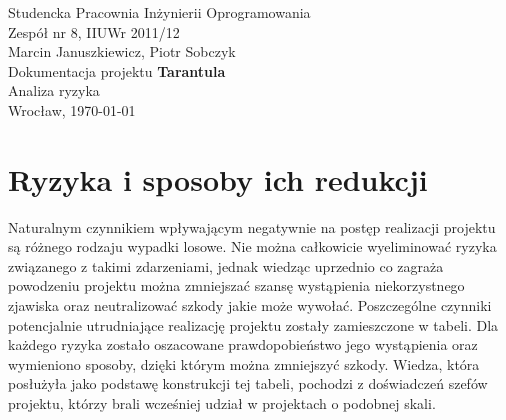 \documentclass[11pt,leqno]{article}
\begin{document}
\begin{center}
\thispagestyle{empty}
{\Large Studencka Pracownia Inżynierii Oprogramowania}\\[0.5cm]
{\Large Zespół nr 8, IIUWr 2011/12}\\[2.5cm]

{Marcin Januszkiewicz, Piotr Sobczyk}\\[0.5cm]
{\huge Dokumentacja projektu \textbf{Tarantula}}\\[0.25cm]
{ Analiza ryzyka}\\[0.5cm]
\vfill
{\large Wrocław, \today}
\end{center}

\newpage
\tableofcontents
\newpage

\section{Ryzyka i sposoby ich redukcji}
Naturalnym czynnikiem wpływającym negatywnie na postęp realizacji projektu są różnego rodzaju wypadki losowe. Nie można całkowicie wyeliminować ryzyka związanego
z takimi zdarzeniami, jednak wiedząc uprzednio co zagraża powodzeniu projektu można zmniejszać szansę wystąpienia niekorzystnego zjawiska oraz neutralizować szkody
jakie może wywołać. Poszczególne czynniki potencjalnie utrudniające realizację projektu zostały zamieszczone w tabeli. 
Dla każdego ryzyka zostało oszacowane prawdopobieństwo jego wystąpienia oraz wymieniono sposoby, dzięki którym można zmniejszyć szkody. 
Wiedza, która posłużyła jako podstawę konstrukcji tej tabeli, pochodzi z doświadczeń szefów projektu, którzy brali wcześniej udział w projektach o podobnej skali.
\end{document}

